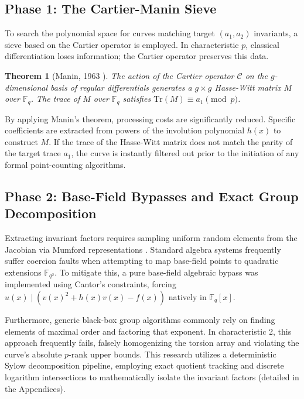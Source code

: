 \documentclass[letterpaper, 11pt]{article}
\newtheorem{theorem}{Theorem}[section]
\begin{document}
\subsection{Phase 1: The Cartier-Manin Sieve}
To search the polynomial space for curves matching target $(a_1, a_2)$ invariants, a sieve based on the Cartier operator \cite{Cartier1958} is employed. In characteristic $p$, classical differentiation loses information; the Cartier operator preserves this data.

\begin{theorem}[Manin, 1963 \cite{Manin1963}]
The action of the Cartier operator $\mathcal{C}$ on the $g$-dimensional basis of regular differentials generates a $g \times g$ Hasse-Witt matrix $M$ over $\mathbb{F}_q$. The trace of $M$ over $\mathbb{F}_q$ satisfies $\text{Tr}(M) \equiv a_1 \pmod p$.
\end{theorem}

By applying Manin's theorem, processing costs are significantly reduced. Specific coefficients are extracted from powers of the involution polynomial $h(x)$ to construct $M$. If the trace of the Hasse-Witt matrix does not match the parity of the target trace $a_1$, the curve is instantly filtered out prior to the initiation of any formal point-counting algorithms.

\subsection{Phase 2: Base-Field Bypasses and Exact Group Decomposition}
Extracting invariant factors requires sampling uniform random elements from the Jacobian via Mumford representations \cite{Cantor1987}. Standard algebra systems frequently suffer coercion faults when attempting to map base-field points to quadratic extensions $\mathbb{F}_{q^2}$. To mitigate this, a pure base-field algebraic bypass was implemented using Cantor's constraints, forcing $u(x) \mid \left( v(x)^2 + h(x)v(x) - f(x) \right)$ natively in $\mathbb{F}_q[x]$.

Furthermore, generic black-box group algorithms commonly rely on finding elements of maximal order and factoring that exponent. In characteristic 2, this approach frequently fails, falsely homogenizing the torsion array and violating the curve's absolute $p$-rank upper bounds. This research utilizes a deterministic Sylow decomposition pipeline, employing exact quotient tracking and discrete logarithm intersections to mathematically isolate the invariant factors (detailed in the Appendices).
\end{document}
